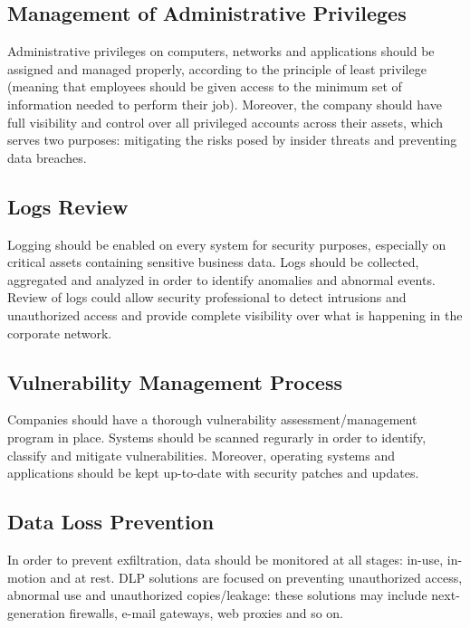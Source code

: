 	\subsection{Management of Administrative Privileges}
	Administrative privileges on computers, networks and applications should be assigned and managed properly, according to the principle of least privilege (meaning that employees should be given access to the minimum set of information needed to perform their job). Moreover, the company should have full visibility and control over all privileged accounts across their assets, which serves two purposes: mitigating the risks posed by insider threats and preventing data breaches.
	\subsection{Logs Review}
	Logging should be enabled on every system for security purposes, especially on critical assets containing sensitive business data. Logs should be collected, aggregated and analyzed in order to identify anomalies and abnormal events. Review of logs could allow security professional to detect intrusions and unauthorized access and provide complete visibility over what is happening in the corporate network.
	\subsection{Vulnerability Management Process}
	Companies should have a thorough vulnerability assessment/management program in place. Systems should be scanned regurarly in order to identify, classify and mitigate vulnerabilities. Moreover, operating systems and applications should be kept up-to-date with security patches and updates.
	\subsection{Data Loss Prevention}
	In order to prevent exfiltration, data should be monitored at all stages: in-use, in-motion and at rest. DLP solutions are focused on preventing unauthorized access, abnormal use and unauthorized copies/leakage: these solutions may include next-generation firewalls, e-mail gateways, web proxies and so on.